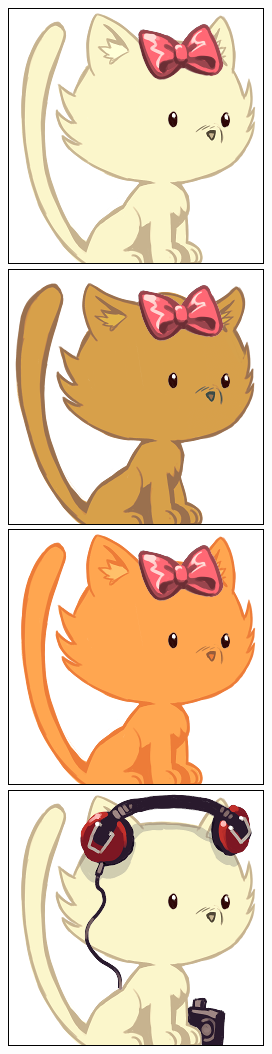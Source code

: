 \documentclass[a4paper, 12pt]{article}
\begin{document}
  \includegraphics[scale=0.45]{out/13.png}
  \includegraphics[scale=0.45]{out/14.png}
  \includegraphics[scale=0.45]{out/15.png}
  \includegraphics[scale=0.45]{out/16.png}
\end{document}
